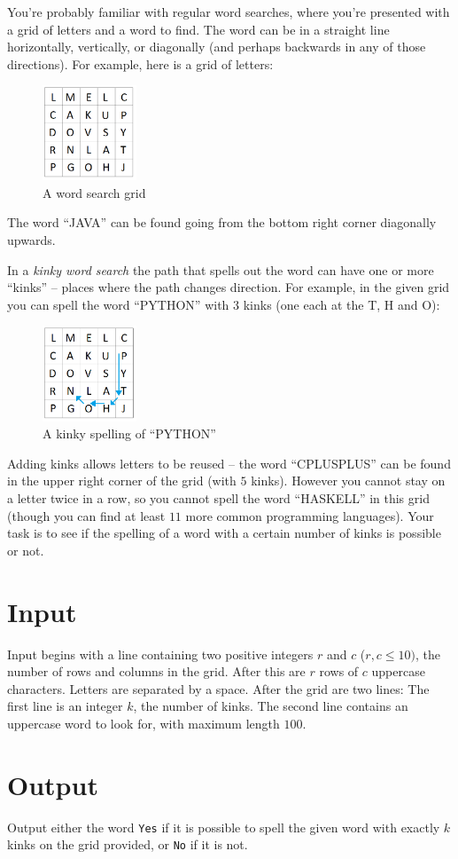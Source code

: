 
You're probably familiar with regular word searches, where you're presented with a grid of letters and a word to find.  The word can be in a straight line horizontally, vertically, or diagonally (and perhaps backwards in any of those directions).  For example, here is a grid of letters:

\begin{figure}[!h]
\centering
\includegraphics[width=0.25\textwidth]{kinky1.png}
\caption{A word search grid}
\end{figure}

The word ``JAVA'' can be found going from the bottom right corner diagonally upwards.

In a {\em kinky word search\/} the path that spells out the word can have one or more ``kinks'' -- places where the path changes direction.  For example, in the given grid you can spell the word ``PYTHON'' with $3$ kinks (one each at the T, H and  O):

\begin{figure}[!h]
\centering
\includegraphics[width=0.25\textwidth]{kinky2.png}
\caption{A kinky spelling of ``PYTHON''}
\end{figure}

Adding kinks allows letters to be reused -- the word ``CPLUSPLUS'' can be found in the upper right corner of the grid (with $5$ kinks).  However you cannot stay on a letter twice in a row, so you cannot spell the word ``HASKELL'' in this grid (though you can find at least $11$ more common programming languages).
Your task is to see if the spelling of a word with a certain number of kinks is possible or not.

\section*{Input}
Input begins with a line containing two positive integers $r$ and $c$ ($r, c \leq 10)$, the number of rows and columns in the grid.  After this are $r$ rows of $c$ uppercase characters.  Letters are separated by a space. After the grid are two lines: The first line is an integer $k$, the number of kinks.  The second line contains an uppercase word to look for, with maximum length $100$.

\section*{Output}

Output either the word {\tt Yes} if it is possible to spell the given word with exactly $k$ kinks on the grid provided, or {\tt No} if it is not.
